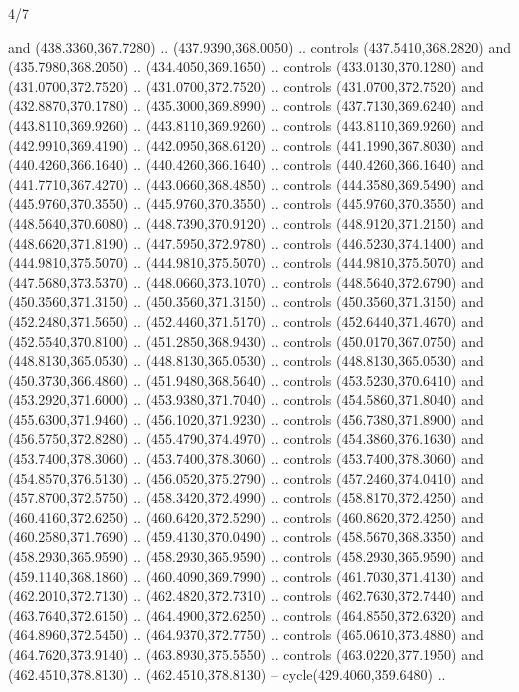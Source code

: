 \begin{flagdescription}{4/7}
\begin{scope}[shift={(0.5\flaglength,0.5\flagwidth)},scale=\flagwidth*\stretchfactor/820]
\begin{scope}[scale=1.87,xshift=-138mm,yshift=75mm]
\begin{scope}[y=0.8pt, x=0.8pt, yscale=-1, xscale=1]
\begin{scope}[fill=c9ca168]
  and (438.3360,367.7280) .. (437.9390,368.0050) .. controls (437.5410,368.2820)
  and (435.7980,368.2050) .. (434.4050,369.1650) .. controls (433.0130,370.1280)
  and (431.0700,372.7520) .. (431.0700,372.7520) .. controls (431.0700,372.7520)
  and (432.8870,370.1780) .. (435.3000,369.8990) .. controls (437.7130,369.6240)
  and (443.8110,369.9260) .. (443.8110,369.9260) .. controls (443.8110,369.9260)
  and (442.9910,369.4190) .. (442.0950,368.6120) .. controls (441.1990,367.8030)
  and (440.4260,366.1640) .. (440.4260,366.1640) .. controls (440.4260,366.1640)
  and (441.7710,367.4270) .. (443.0660,368.4850) .. controls (444.3580,369.5490)
  and (445.9760,370.3550) .. (445.9760,370.3550) .. controls (445.9760,370.3550)
  and (448.5640,370.6080) .. (448.7390,370.9120) .. controls (448.9120,371.2150)
  and (448.6620,371.8190) .. (447.5950,372.9780) .. controls (446.5230,374.1400)
  and (444.9810,375.5070) .. (444.9810,375.5070) .. controls (444.9810,375.5070)
  and (447.5680,373.5370) .. (448.0660,373.1070) .. controls (448.5640,372.6790)
  and (450.3560,371.3150) .. (450.3560,371.3150) .. controls (450.3560,371.3150)
  and (452.2480,371.5650) .. (452.4460,371.5170) .. controls (452.6440,371.4670)
  and (452.5540,370.8100) .. (451.2850,368.9430) .. controls (450.0170,367.0750)
  and (448.8130,365.0530) .. (448.8130,365.0530) .. controls (448.8130,365.0530)
  and (450.3730,366.4860) .. (451.9480,368.5640) .. controls (453.5230,370.6410)
  and (453.2920,371.6000) .. (453.9380,371.7040) .. controls (454.5860,371.8040)
  and (455.6300,371.9460) .. (456.1020,371.9230) .. controls (456.7380,371.8900)
  and (456.5750,372.8280) .. (455.4790,374.4970) .. controls (454.3860,376.1630)
  and (453.7400,378.3060) .. (453.7400,378.3060) .. controls (453.7400,378.3060)
  and (454.8570,376.5130) .. (456.0520,375.2790) .. controls (457.2460,374.0410)
  and (457.8700,372.5750) .. (458.3420,372.4990) .. controls (458.8170,372.4250)
  and (460.4160,372.6250) .. (460.6420,372.5290) .. controls (460.8620,372.4250)
  and (460.2580,371.7690) .. (459.4130,370.0490) .. controls (458.5670,368.3350)
  and (458.2930,365.9590) .. (458.2930,365.9590) .. controls (458.2930,365.9590)
  and (459.1140,368.1860) .. (460.4090,369.7990) .. controls (461.7030,371.4130)
  and (462.2010,372.7130) .. (462.4820,372.7310) .. controls (462.7630,372.7440)
  and (463.7640,372.6150) .. (464.4900,372.6250) .. controls (464.8550,372.6320)
  and (464.8960,372.5450) .. (464.9370,372.7750) .. controls (465.0610,373.4880)
  and (464.7620,373.9140) .. (463.8930,375.5550) .. controls (463.0220,377.1950)
  and (462.4510,378.8130) .. (462.4510,378.8130) -- cycle(429.4060,359.6480) ..

\end{scope}
\end{scope}
\end{scope}
\end{scope}
\end{flagdescription}
